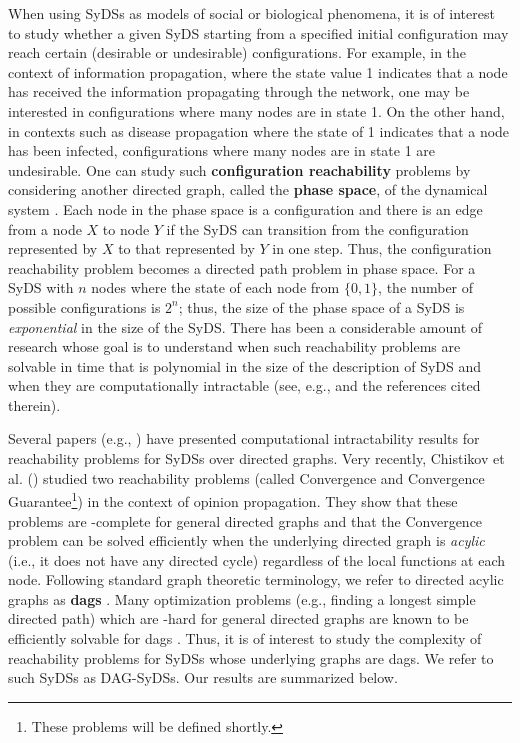 When using SyDSs as models of social or biological phenomena, it is of interest 
to study whether a given SyDS starting from a specified
initial configuration  may reach certain
(desirable or undesirable) configurations.
For example, in the context of information propagation, where the
state value 1 indicates that a node has received the information
propagating through the network,
one may be interested in configurations where many nodes are in state 1.
On the other hand, in contexts such as disease propagation where
the state of 1 indicates that a node has been infected,
configurations where many nodes are in state 1 are undesirable.
One can study such \textbf{configuration reachability} problems
by considering another directed graph,
called the \textbf{phase space}, of the dynamical system \cite{MR-2007}.
Each node in the phase space is a configuration and there is an
edge from a node $X$ to node $Y$ if the SyDS can transition from
the configuration represented by $X$ to that represented by
$Y$ in one step.
Thus, the configuration reachability problem becomes a directed
path problem in phase space.
For a SyDS with $n$ nodes where the state of each node from $\{0,1\}$,
the number of possible configurations is $2^n$; thus, the size of
the phase space of a SyDS is \emph{exponential} in the size of
the SyDS.
There has been a considerable amount of research whose goal is
to understand when such reachability problems are solvable
in time that is polynomial in the size of the description of SyDS 
and when they are computationally intractable 
(see, e.g., \cite{Chistikov-etal-2020,OU-2020,OU-2017,Akutsu-etal-2007}
and the references cited therein).

Several papers (e.g., \cite{OU-2017,Akutsu-etal-2007}) have
presented computational intractability results for reachability 
problems for SyDSs over directed graphs.
Very recently, Chistikov et al. (\citeyear{Chistikov-etal-2020})
studied two reachability problems (called Convergence and Convergence
Guarantee\footnote{These problems will be defined shortly.}) 
in the context of opinion propagation.
They show that these problems are \cpsp-complete for general
directed graphs and
that the Convergence problem can be solved
efficiently when the underlying directed graph is \emph{acylic} (i.e.,
it does not have any directed cycle) regardless of the local functions
at each node.
Following standard graph theoretic terminology, we refer to directed
acylic graphs as \textbf{dags} \cite{CLRS-2009}.
Many optimization problems (e.g., finding a longest simple directed path) which
are \cnp-hard for general directed graphs are known to be efficiently
solvable for dags \cite{GJ-1979}.
Thus, it is of interest to study the complexity of reachability problems for
SyDSs whose underlying graphs are dags.
We refer to such SyDSs as DAG-SyDSs.
Our results are summarized below.

